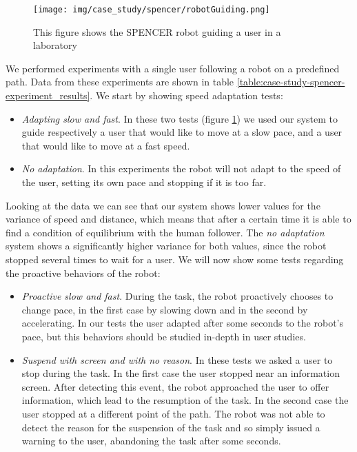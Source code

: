 \begin{figure}[ht!]
	\centering
	\texttt{[image: img/case\_study/spencer/robotGuiding.png]}
	\caption[Robot Guide laboratory experiment]{This figure shows the SPENCER robot guiding a user in a laboratory}
	\label{fig:case_study-spencer-robotGuiding}
\end{figure}

We performed experiments with a single user following a robot on a predefined path. Data from these experiments are shown in table \ref{table:case-study-spencer-experiment_results}. We start by showing speed adaptation tests:
\begin{itemize}
\item \textit{Adapting slow and fast}. In these two tests (figure \ref{fig:case_study-spencer-robotGuiding}) we used our system to guide respectively a user that would like to move at a slow pace, and a user that would like to move at a fast speed.
\item \textit{No adaptation}. In this experiments the robot will not adapt to the speed of the user, setting its own pace and stopping if it is too far.
\end{itemize}

Looking at the data we can see that our system shows lower values for the variance of speed and distance, which means that after a certain time it is able to find a condition of equilibrium with the human follower. The \textit{no adaptation} system shows a significantly higher variance for both values, since the robot stopped several times to wait for a user. We will now show some tests regarding the proactive behaviors of the robot:

\begin{itemize}
\item \textit{Proactive slow and fast}. During the task, the robot proactively chooses to change pace, in the first case by slowing down and in the second by accelerating. In our tests the user adapted after some seconds to the robot's pace, but this behaviors should be studied in-depth in user studies.
\item \textit{Suspend with screen and with no reason}. In these tests we asked a user to stop during the task. In the first case the user stopped near an information screen. After detecting this event, the robot approached the user to offer information, which lead to the resumption of the task. In the second case the user stopped at a different point of the path. The robot was not able to detect the reason for the suspension of the task and so simply   issued a warning to the user, abandoning the task after some seconds.
\end{itemize}


